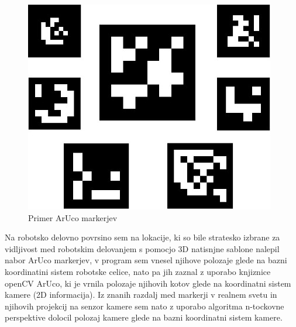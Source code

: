 \documentclass[a4paper,twoside,openright,12pt,slovene]{book}
\begin{document}
\begin{figure}[H]
    \centering
    \includegraphics[width=0.5\columnwidth]{Slike/markers.jpg}
    \caption{\label{ArUco_markers} Primer ArUco markerjev}
\end{figure}

Na robotsko delovno povrsino sem na lokacije, ki so bile stratesko izbrane za vidljivost med robotskim delovanjem s pomocjo 3D natisnjne sablone nalepil nabor ArUco markerjev, v program sem vnesel njihove polozaje glede na bazni koordinatini sistem robotske celice, nato pa jih zaznal z uporabo knjiznice openCV ArUco, ki je vrnila polozaje njihovih kotov glede na koordinatni sistem kamere (2D informacija). Iz znanih razdalj med markerji v realnem svetu in njihovih projekcij na senzor kamere sem nato z uporabo algoritma n-tockovne perspektive dolocil polozaj kamere glede na bazni koordinatni sistem kamere.
\end{document}
